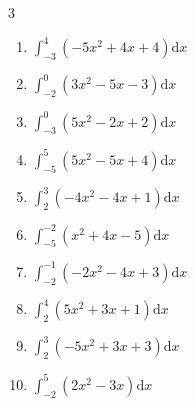 \begin{multicols}{3}
\begin{enumerate}
  \item $\displaystyle \int_{-3}^{4}\left( -5x^{2}+4x+4 \right) \mathrm{d}x$

        \phantom{$\displaystyle =-133$}

  \item $\displaystyle \int_{-2}^{0}\left( 3x^{2}-5x-3 \right) \mathrm{d}x$

        \phantom{$\displaystyle =17$}

  \item $\displaystyle \int_{-3}^{0}\left( 5x^{2}-2x+2 \right) \mathrm{d}x$

        \phantom{$\displaystyle =55$}

  \item $\displaystyle \int_{-5}^{5}\left( 5x^{2}-5x+4 \right) \mathrm{d}x$


  \item $\displaystyle \int_{2}^{3}\left( -4x^{2}-4x+1 \right) \mathrm{d}x$


\columnbreak %

\resetques

  \item $\displaystyle \int_{-5}^{-2}\left( x^{2}+4x-5 \right) \mathrm{d}x$


  \item $\displaystyle \int_{-2}^{-1}\left( -2x^{2}-4x+3 \right) \mathrm{d}x$


  \item $\displaystyle \int_{2}^{4}\left( 5x^{2}+3x+1 \right) \mathrm{d}x$


  \item $\displaystyle \int_{2}^{3}\left( -5x^{2}+3x+3 \right) \mathrm{d}x$


  \item $\displaystyle \int_{-2}^{5}\left( 2x^{2}-3x \right) \mathrm{d}x$


\columnbreak %


\end{enumerate}
\end{multicols}

